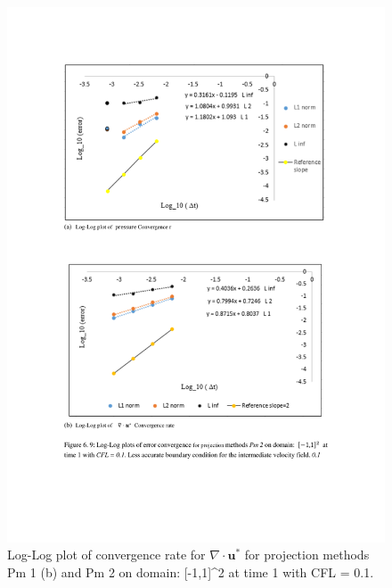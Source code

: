 \begin{figure}[H]
	\centering
	\includegraphics[scale=0.9]{figures/Pm2_2_rate_t_1_cfl_0_1.pdf}
	\caption{Log-Log plot of convergence rate for $\nabla \cdot \textbf{u}^*$ for projection methods Pm 1 (b) and Pm 2 on domain: [-1,1]^2 at time 1 with CFL = 0.1. }\label{fig:6.9}
\end{figure}


